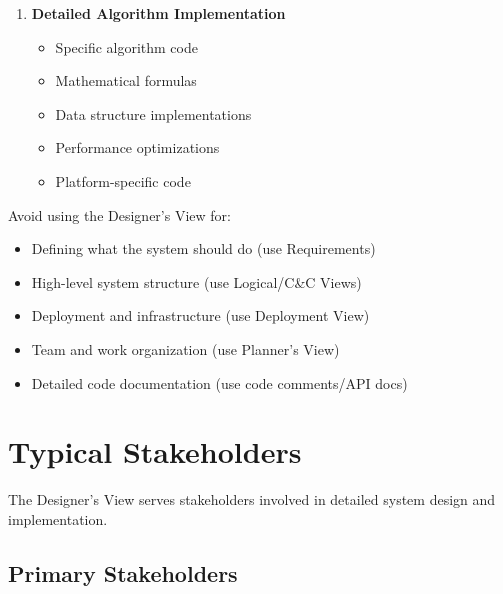 \documentclass[11pt,letterpaper]{article}
\begin{document}
\begin{enumerate}[label=\textbf{AC\arabic*:}, leftmargin=2.5em]
    \item \textbf{Detailed Algorithm Implementation}
    \begin{itemize}[nosep]
        \item Specific algorithm code
        \item Mathematical formulas
        \item Data structure implementations
        \item Performance optimizations
        \item Platform-specific code
    \end{itemize}
\end{enumerate}

\begin{warningbox}
Avoid using the Designer's View for:

\begin{itemize}[nosep]
    \item Defining what the system should do (use Requirements)
    \item High-level system structure (use Logical/C\&C Views)
    \item Deployment and infrastructure (use Deployment View)
    \item Team and work organization (use Planner's View)
    \item Detailed code documentation (use code comments/API docs)
\end{itemize}
\end{warningbox}

\section{Typical Stakeholders}

The Designer's View serves stakeholders involved in detailed system design and implementation.

\subsection{Primary Stakeholders}
\end{document}
